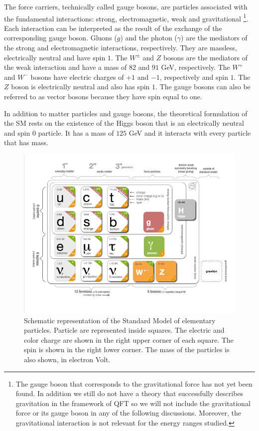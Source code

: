 The force carriers, technically called gauge bosons, are particles associated with the fundamental interactions: strong, electromagnetic, weak and gravitational \footnote{The gauge boson that corresponds to the gravitational force has not yet been found. In addition we still do not have a theory that successfully describes gravitation in the framework of QFT so we will not include the gravitational force or its gauge boson in any of the following discussions. Moreover, the gravitational interaction is not relevant for the energy ranges studied.}. Each interaction can be interpreted as the result of the exchange of the corresponding gauge boson. Gluons ($g$) and the photon ($\gamma$) are the mediators of the strong and electromagnetic interactions, respectively. They are massless, electrically neutral and have spin $1$. The $W^{\pm}$ and $Z$ bosons are the mediators of the weak interaction and have a mass of $82$ and $91$ GeV, respectively. The $W^+$ and $W^-$ bosons have electric charges of $+1$ and $-1$, respectively and spin $1$. The $Z$ boson is electrically neutral and also has spin $1$. The gauge bosons can also be referred to as vector bosons because they have spin equal to one.

In addition to matter particles and gauge bosons, the theoretical formulation of the SM rests on the existence of the Higgs boson that is an electrically neutral and spin $0$ particle. It has a mass of $125$ GeV and it interacts with every particle that has mass.


\begin{figure}[]
	\centering
	\includegraphics[trim={.5cm 1.5cm 0.5cm 0},clip,width=.8\textwidth]{./Figures/SM_CERN.png}
	\caption{Schematic representation of the Standard Model of elementary particles. Particle are represented inside squares. The electric and color charge are shown in the right upper corner of each square. The spin is shown in the right lower corner. The mass of the particles is also shown, in electron Volt.}
	\label{fig:sm_particles}
\end{figure}

